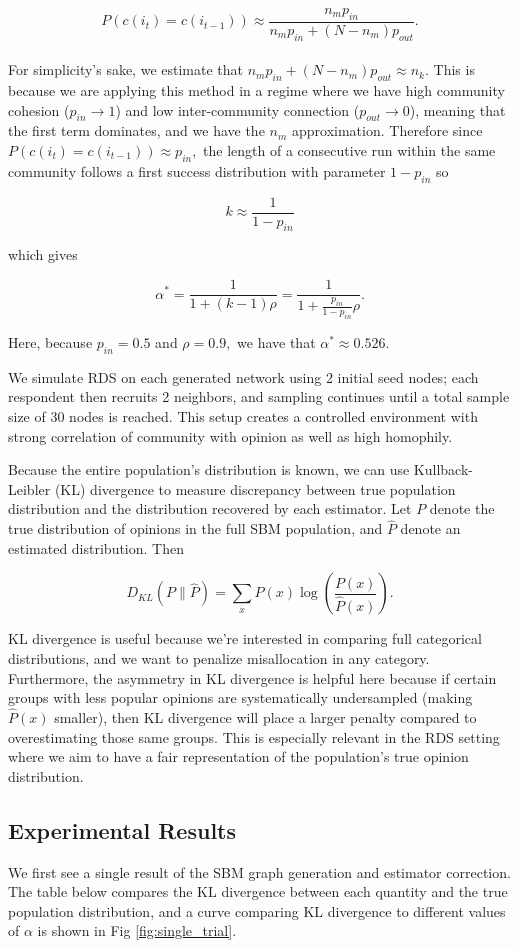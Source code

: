 \documentclass[11pt,a4paper,twocolumn,twoside]{rho-class/rho}
\begin{document}
\[
P(c(i_t) = c(i_{t - 1})) \approx \frac{n_m p_{in}}{n_m p_{in} + (N-n_m) p_{out}}.
\]
\\

\noindent For simplicity's sake, we estimate that $n_m p_{in} + (N - n_m) p_{out} \approx n_k.$ This is because we are applying this method in a regime where we have high community cohesion ($p_{in} \to 1$) and low inter-community connection ($p_{out} \to 0$), meaning that the first term dominates, and we have the $n_m$ approximation. Therefore since $P(c(i_t) = c(i_{t - 1})) \approx p_{in},$ the length of a consecutive run within the same community follows a first success distribution with parameter $1 - {p_{in}}$ so

\[
k\approx \frac{1}{1 - p_{in}}
\]

\noindent which gives

\[
\alpha^* = \frac{1}{1 + (k - 1)\rho} = \frac{1}{1 + \frac{p_{in}}{1 - p_{in}}\rho}.
\]

\noindent Here, because $p_{in} = 0.5$ and $\rho = 0.9,$ we have that $\alpha^* \approx 0.526.$

We simulate RDS on each generated network using 2 initial seed nodes; each respondent then recruits 2 neighbors, and sampling continues until a total sample size of 30 nodes is reached. This setup creates a controlled environment with strong correlation of community with opinion as well as high homophily. 

Because the entire population's distribution is known, we can use Kullback-Leibler (KL) divergence to measure discrepancy between true population distribution and the distribution recovered by each estimator. Let $P$ denote the true distribution of opinions in the full SBM population, and $\hat P$ denote an estimated distribution. Then

\[
D_{KL}(P \| \hat P) = \sum_x P(x) \log \left(\frac{P(x)}{\hat P(x)}\right).
\]

KL divergence is useful because we're interested in comparing full categorical distributions, and we want to penalize misallocation in any category. Furthermore, the asymmetry in KL divergence is helpful here because if certain groups with less popular opinions are systematically undersampled (making $\hat P(x)$ smaller), then KL divergence will place a larger penalty compared to overestimating those same groups. This is especially relevant in the RDS setting where we aim to have a fair representation of the population's true opinion distribution.

\subsection{Experimental Results}
We first see a single result of the SBM graph generation and estimator correction. The table below compares the KL divergence between each quantity and the true population distribution, and a curve comparing KL divergence to different values of $\alpha$ is shown in Fig \ref{fig:single_trial}. 
\end{document}
